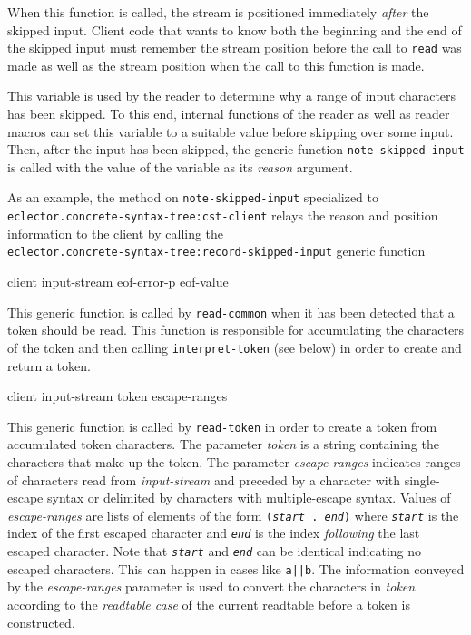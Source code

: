 When this function is called, the stream is positioned immediately
\emph{after} the skipped input.  Client code that wants to know both
the beginning and the end of the skipped input must remember the
stream position before the call to \texttt{read} was made as well as
the stream position when the call to this function is made.


This variable is used by the reader to determine why a range of input
characters has been skipped.  To this end, internal functions of the
reader as well as reader macros can set this variable to a suitable
value before skipping over some input.  Then, after the input has been
skipped, the generic function \texttt{note-skipped-input} is called
with the value of the variable as its \textit{reason} argument.

As an example, the method on \texttt{note-skipped-input} specialized
to\\
\texttt{eclector.concrete-syntax-tree:cst-client} relays the reason
and position information to the client by calling the\\
\texttt{eclector.concrete-syntax-tree:record-skipped-input} generic
function 

 {client input-stream eof-error-p eof-value}

This generic function is called by \texttt{read-common} when it has
been detected that a token should be read.  This function is
responsible for accumulating the characters of the token and then
calling \texttt{interpret-token} (see below) in order to create and
return a token.

 {client input-stream token escape-ranges}

This generic function is called by \texttt{read-token} in order to
create a token from accumulated token characters.  The parameter
\textit{token} is a string containing the characters that make up the
token.  The parameter \textit{escape-ranges} indicates ranges of
characters read from \textit{input-stream} and preceded by a character
with single-escape syntax or delimited by characters with
multiple-escape syntax.  Values of \textit{escape-ranges} are lists of
elements of the form \texttt{(\textit{start}\ .\ \textit{end})} where
\texttt{\textit{start}} is the index of the first escaped character
and \texttt{\textit{end}} is the index \textit{following} the last
escaped character.  Note that \texttt{\textit{start}} and
\texttt{\textit{end}} can be identical indicating no escaped
characters.  This can happen in cases like \texttt{a||b}.  The
information conveyed by the \textit{escape-ranges} parameter is used
to convert the characters in \textit{token} according to the
\emph{readtable case} of the current readtable before a token is
constructed.

